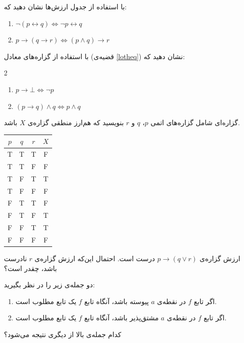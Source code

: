 \begin{problem} \label{loprpttp}
	با استفاده از جدول ارزش‌ها نشان دهید که:
	\begin{enumerate}
		\item 
		$\neg(p \leftrightarrow q) \iff \neg p \leftrightarrow q$
		\item 
		$p \rightarrow (q \rightarrow r) \iff (p \wedge q) \rightarrow r$
	\end{enumerate}
\end{problem}

\begin{problem} \label{loprestentaj}
	با استفاده از گزاره‌های معادل (قضیه‌ی \ref{lotheq}) نشان دهید که:
	\vspace{-5mm}
	\begin{multicols}{2}
		\begin{enumerate}
			\item 
			$p \rightarrow \bot \iff \neg p$
			\item 
			$(p \rightarrow q) \wedge q \iff p \wedge q$
		\end{enumerate}
	\end{multicols}
	\vspace{1pt}
\end{problem}

\begin{problem} \label{loprpqreqx}
	گزاره‌ای شامل گزاره‌های اتمی $p$، $q$ و $r$ بنویسید که هم‌ارز منطقی گزاره‌ی $X$ باشد.
	\vspace{-2mm}
	\begin{table}[H]
		\centering
		\begin{latin}
			\begin{tabular}{c|c|c|c}
				$p$ & $q$ & $r$ & $X$ \\
				\hline
				T & T & T & F \\
				T & T & F & F \\
				T & F & T & T \\
				T & F & F & F \\
				F & T & T & F \\
				F & T & F & T \\
				F & F & T & T \\
				F & F & F & F
			\end{tabular}
		\end{latin}
	\end{table}
\end{problem}

\begin{problem} \label{loprttpr}
	ارزش گزاره‌ی
	$p \rightarrow (q \vee r)$
	درست است. احتمال این‌که ارزش گزاره‌ی $r$ نادرست باشد، چقدر است؟
\end{problem}

\begin{problem}  \label{loprcafcd}
	دو جمله‌ی زیر را در نظر بگیرید:
	\begin{enumerate}
		\item 
		اگر تابع $f$ در نقطه‌ی $a$ پیوسته باشد، آنگاه تابع $f$ یک تابع مطلوب است.
		\item 
		اگر تابع $f$ در نقطه‌ی $a$ مشتق‌پذیر باشد، آنگاه تابع $f$ یک تابع مطلوب است.
	\end{enumerate}
	کدام جمله‌ی بالا از دیگری نتیجه می‌شود؟
\end{problem}
